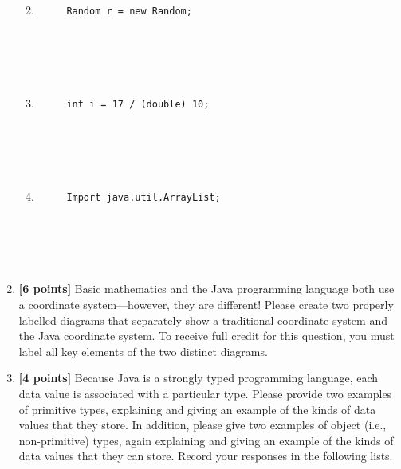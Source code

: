 \documentclass[11pt]{report}
\begin{document}
\begin{enumerate}
\begin{enumerate}
\begin{verbatim}
     
     
     
     
\end{verbatim}
\item \mbox{}

\begin{verbatim}
     Random r = new Random;
     
     
     
     
     
\end{verbatim}
\item \mbox{}

\begin{verbatim}
     int i = 17 / (double) 10;
     
     
     
     
     
\end{verbatim}

\item \mbox{}

\begin{verbatim}
     Import java.util.ArrayList;
     
     
     
     
     
\end{verbatim}
\end{enumerate}

\vspace*{-.75in}
\item{\bf [6 points]} Basic mathematics and the Java programming language both use a coordinate system---however, they
  are different! Please create two properly labelled diagrams that separately show a traditional coordinate system and
  the Java coordinate system. To receive full credit for this question, you must label all key elements of the two
  distinct diagrams.

  \vspace*{2in}

\item{\bf [4 points]} Because Java is a strongly typed programming language, each data value is associated with a
  particular type. Please provide two examples of primitive types, explaining and giving an example of the kinds of
  data values that they store.  In addition, please give two examples of object (i.e., non-primitive) types, again
  explaining and giving an example of the kinds of data values that they can store. Record your responses in the
  following lists.


\end{enumerate}
\end{document}
